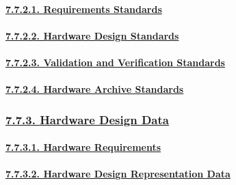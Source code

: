 \documentclass[
]{article}
\begin{document}
\hypertarget{requirements-standards}{%
\paragraph{\texorpdfstring{\protect\hyperlink{requirements-standards-1}{7.7.2.1.
Requirements
Standards}}{7.7.2.1. Requirements Standards}}\label{requirements-standards}}

\hypertarget{hardware-design-standards}{%
\paragraph{\texorpdfstring{\protect\hyperlink{hardware-design-standards-1}{7.7.2.2.
Hardware Design
Standards}}{7.7.2.2. Hardware Design Standards}}\label{hardware-design-standards}}

\hypertarget{validation-and-verification-standards}{%
\paragraph{\texorpdfstring{\protect\hyperlink{validation-and-verification-standards-1}{7.7.2.3.
Validation and Verification
Standards}}{7.7.2.3. Validation and Verification Standards}}\label{validation-and-verification-standards}}

\hypertarget{hardware-archive-standards}{%
\paragraph{\texorpdfstring{\protect\hyperlink{hardware-archive-standards-1}{7.7.2.4.
Hardware Archive
Standards}}{7.7.2.4. Hardware Archive Standards}}\label{hardware-archive-standards}}

\hypertarget{hardware-design-data}{%
\subsubsection{\texorpdfstring{\protect\hyperlink{hardware-design-data-1}{7.7.3.
Hardware Design
Data}}{7.7.3. Hardware Design Data}}\label{hardware-design-data}}

\hypertarget{hardware-requirements}{%
\paragraph{\texorpdfstring{\protect\hyperlink{hardware-requirements-1}{7.7.3.1.
Hardware
Requirements}}{7.7.3.1. Hardware Requirements}}\label{hardware-requirements}}

\hypertarget{hardware-design-representation-data}{%
\paragraph{\texorpdfstring{\protect\hyperlink{hardware-design-representation-data-1}{7.7.3.2.
Hardware Design Representation
Data}}{7.7.3.2. Hardware Design Representation Data}}\label{hardware-design-representation-data}}
\end{document}
